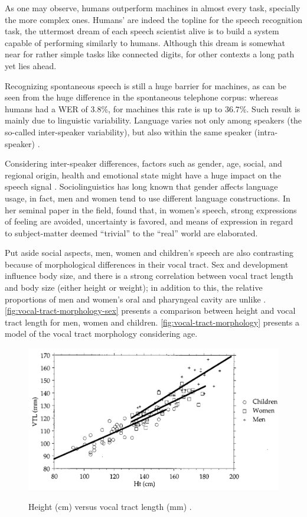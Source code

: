 As one may observe, humans outperform machines in almost every task, specially the more complex ones. 
Humans' are indeed the topline for the speech recognition task, the uttermost dream of each speech 
scientist alive is to build a system capable of performing similarly to humans. Although this dream is somewhat near
for rather simple tasks like connected digits, for other contexts a long path yet lies ahead. 

Recognizing spontaneous speech is still a huge barrier for machines, as can be seen from the huge difference
in the spontaneous telephone corpus: whereas humans had a WER of $3.8\%$, for machines this rate is up to $36.7\%$.
Such result is mainly due to linguistic variability. Language varies not only among speakers (the so-called 
inter-speaker variability), but also within the same speaker (intra-speaker) \citep{Benzeghiba2007}. 

Considering inter-speaker differences, factors such as gender, age, social, and regional 
origin, health and emotional state might have a huge impact on the speech signal \citep{Benzeghiba2007}.
Sociolinguistics has long known that gender affects language usage, in fact, men and women tend to use different language constructions.
In her seminal paper in the field, \citet{Lakoff1973} \citep{Lakoff1973} found that, in women's speech, strong expressions 
of feeling are avoided, uncertainty is favored, and means of expression in regard to subject-matter deemed ``trivial'' to the 
``real'' world are elaborated. 

Put aside social aspects, men, women and children's speech are also contrasting because of morphological differences
in their vocal tract. Sex and development influence body size, and there is a strong correlation between vocal tract length and body size 
(either height or weight); in addition to this, the relative proportions of men and women's oral and pharyngeal cavity are unlike 
\cite{Fitch1999}. \autoref{fig:vocal-tract-morphology-sex} presents a comparison between height and
vocal tract length for men, women and children. \autoref{fig:vocal-tract-morphology} presents a model of the vocal tract morphology considering
age.

\begin{figure}[H]
        \myfloatalign
        {\includegraphics[width=.66\linewidth]{gfx/vocal-tract-size-sex.png}}
        \caption{Height (cm) versus vocal tract length (mm) \cite{Fitch1999}.}
        \label{fig:vocal-tract-morphology-sex}
\end{figure}

